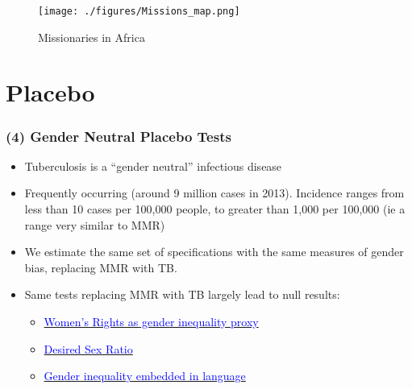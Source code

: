 \documentclass[10pt,letterpaper,subeqn]{beamer}
\begin{document}
\begin{frame}[label=MissionsMap]
\vspace{1cm}
%
\begin{figure}[h!]
\centering
\texttt{[image: ./figures/Missions\_map.png]}
\caption{Missionaries in Africa }
\end{figure}
\vspace{1cm}

\end{frame}

\begin{frame}[label=MissionsTab]
\vspace{1cm}

\vspace{1cm}
\end{frame}

\section{Placebo}



\begin{frame}[label=placebos]
\frametitle{(4) Gender Neutral Placebo Tests}
\begin{itemize}
\setlength{\itemsep}{15pt}
  \item Tuberculosis is a ``gender neutral'' infectious disease
  \item Frequently occurring (around 9 million cases in 2013). Incidence ranges
        from less than 10 cases per 100,000 people, to greater than 1,000 per
        100,000 (ie a range very similar to MMR)
  \item We estimate the same set of specifications with the same measures of
        gender bias, replacing MMR with TB.
  \item Same tests replacing MMR with TB largely lead to null results:
  \begin{itemize}
    \item \hyperlink{placebo1}{\textcolor{blue}{Women's Rights as gender
                                                inequality proxy}}
    \item \hyperlink{placebo2}{\textcolor{blue}{Desired Sex Ratio}}
    \item \hyperlink{placebo3}{\textcolor{blue}{Gender inequality embedded in
                                                language}}
  \end{itemize}
\end{itemize}
\end{frame}
\end{document}
